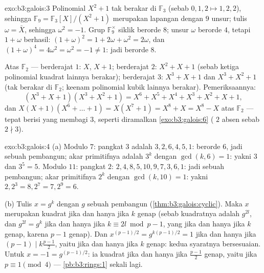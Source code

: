 \begin{solution}{exo:b3:galois:3}
Polinomial $X^2 + 1$ tak berakar di $\mathbb F_3$ (sebab $0, 1, 2 \mapsto 1, 2,
2$), sehingga $\mathbb F_9 = \mathbb F_3[X]/(X^2+1)$ merupakan lapangan dengan
$9$ unsur; tulis $\omega = \bar X$, sehingga $\omega^2 = -1$. Grup
$\mathbb F_9^\times$ siklik berorde $8$; unsur $\omega$ berorde
$4$, tetapi $1 + \omega$ berhasil: $(1+\omega)^2 = 1 + 2\omega +
\omega^2 = 2\omega$, dan $(1+\omega)^4 = 4\omega^2 = \omega^2 = -1
\ne 1$: jadi berorde $8$.

Atas $\mathbb F_2$ --- berderajat $1$: $X$, $X + 1$; berderajat $2$:
$X^2 + X + 1$ (sebab ketiga polinomial kuadrat lainnya berakar); berderajat
$3$: $X^3 + X + 1$ dan $X^3 + X^2 + 1$ (tak berakar di $\mathbb
F_2$; keenam polinomial kubik lainnya berakar). Pemeriksaannya:
\[
(X^3{+}X{+}1)(X^3{+}X^2{+}1) = X^6 + X^5 + X^4 + X^3 + X^2 + X
+ 1,
\]
dan $X(X{+}1)(X^6 + \dots + 1) = X(X^7 + 1) = X^8 + X = X^8 -
X$ atas $\mathbb F_2$ --- tepat berisi  yang 
membagi $3$, seperti diramalkan \cref{exo:b3:galois:6} ( $2$
absen sebab $2 \nmid 3$).
\end{solution}

\begin{solution}{exo:b3:galois:4}
(a) Modulo $7$: pangkat $3$ adalah $3, 2, 6, 4, 5, 1$: berorde
$6$, jadi sebuah pembangun; akar primitifnya adalah $3^k$ dengan
$\gcd(k, 6) = 1$: yakni $3$ dan $3^5 = 5$. Modulo $11$: pangkat $2$:
$2, 4, 8, 5, 10, 9, 7, 3, 6, 1$: jadi sebuah pembangun; akar primitifnya
$2^k$ dengan $\gcd(k, 10) = 1$: yakni $2, 2^3 = 8, 2^7 = 7, 2^9 = 6$.

(b) Tulis $x = g^k$ dengan $g$ sebuah pembangun
(\cref{thm:b3:galois:cyclic}). Maka $x$ merupakan kuadrat jika dan hanya jika $k$
genap (sebab kuadratnya adalah $g^{2l}$, dan $g^{2l} = g^{k}$ jika dan hanya jika $k
\equiv 2l \bmod p-1$, yang  jika dan hanya jika $k$ genap, karena $p - 1$
genap). Dan $x^{(p-1)/2} = g^{k(p-1)/2} = 1$ jika dan hanya jika $(p-1) \mid
k\frac{p-1}2$, yaitu jika dan hanya jika $k$ genap: kedua syaratnya bersesuaian. Untuk $x =
-1 = g^{(p-1)/2}$: ia kuadrat jika dan hanya jika $\frac{p-1}2$ genap, yaitu jika
$p \equiv 1 \pmod 4$ --- \cref{pb:b3:rings:1} sekali lagi.
\end{solution}

